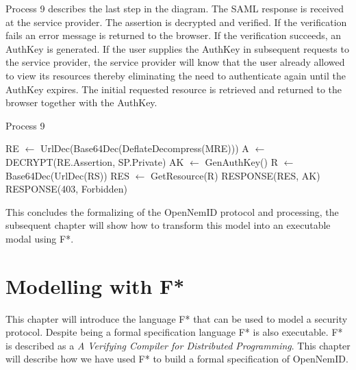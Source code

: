 \documentclass[twosided]{report}
\begin{document}
Process 9 describes the last step in the diagram. The SAML response is received at the service provider. The assertion is decrypted and verified. If the verification fails an error message is returned to the browser. If the verification succeeds, an AuthKey is generated. If the user supplies the AuthKey in subsequent requests to the service provider, the service provider will know that the user already allowed to view its resources thereby eliminating the need to authenticate again until the AuthKey expires. The initial requested resource is retrieved and returned to the browser together with the AuthKey.
\begin{algorithm}[H]
	\caption{Process 9}
	\begin{algorithmic}
		\STATE RE $\leftarrow$ UrlDec(Base64Dec(DeflateDecompress(MRE)))
		\STATE A $\leftarrow$ DECRYPT(RE.Assertion, SP.Private)
			\STATE AK $\leftarrow$ GenAuthKey()
			\STATE R $\leftarrow$ Base64Dec(UrlDec(RS))
			\STATE RES $\leftarrow$ GetResource(R)
			\RETURN RESPONSE(RES, AK)
		\ELSE
			\RETURN RESPONSE(403, Forbidden)
		\ENDIF
	\end{algorithmic}
\end{algorithm}

This concludes the formalizing of the OpenNemID protocol and processing, the subsequent chapter will show how to transform this model into an executable modal using F*.

\chapter{Modelling with F*}
This chapter will introduce the language F* that can be used to model a security protocol. Despite being a formal specification language F* is also executable. F* is described as a \emph{A Verifying Compiler for Distributed Programming}. This chapter will describe how we have used F* to build a formal specification of OpenNemID.
\end{document}
